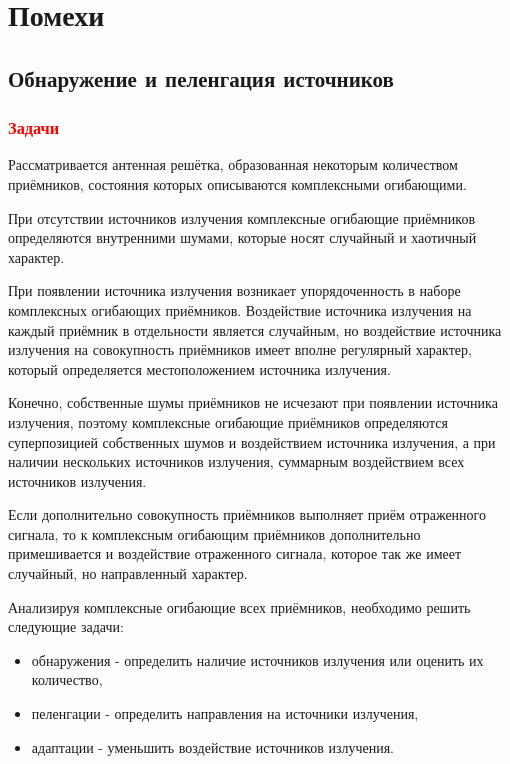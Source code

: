 \chapter{Помехи}


\section{Обнаружение и пеленгация источников}

\subsection{\textcolor{red}{Задачи}}

Рассматривается антенная решётка, образованная некоторым количеством приёмников, состояния которых описываются комплексными огибающими.

При отсутствии источников излучения комплексные огибающие приёмников определяются внутренними шумами, которые носят случайный и хаотичный характер.

При появлении источника излучения возникает упорядоченность в наборе комплексных огибающих приёмников. Воздействие источника излучения на каждый приёмник
в отдельности является случайным, но воздействие источника излучения на совокупность приёмников имеет вполне регулярный характер, который
определяется местоположением источника излучения.

Конечно, собственные шумы приёмников не исчезают при появлении источника излучения, поэтому комплексные огибающие приёмников определяются
суперпозицией собственных шумов и воздействием источника излучения, а при наличии нескольких источников излучения, суммарным воздействием всех источников излучения.

Если дополнительно совокупность приёмников выполняет приём отраженного сигнала, то к комплексным огибающим приёмников дополнительно примешивается и
воздействие отраженного сигнала, которое так же имеет случайный, но направленный характер.

Анализируя комплексные огибающие всех приёмников, необходимо решить следующие задачи:
\begin{itemize}
    \item обнаружения - определить наличие источников излучения или оценить их количество,
    \item пеленгации - определить направления на источники излучения,
    \item адаптации - уменьшить воздействие источников излучения.
\end{itemize}

